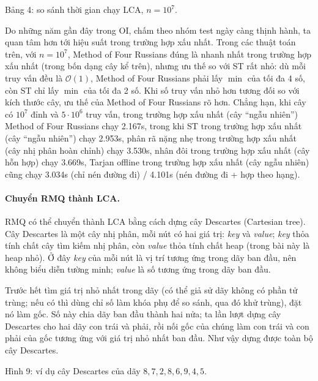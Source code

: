 \documentclass[11pt]{article}
\newcommand{\Oh}{\mathcal{O}}
\begin{document}
\begin{center}
\small Bảng 4: so sánh thời gian chạy LCA, \(n=10^7\).
\end{center}

Do những năm gần đây trong OI, chấm theo nhóm test ngày càng thịnh hành, ta
quan tâm hơn tới hiệu suất trong trường hợp xấu nhất. Trong các thuật toán
trên, với \(n=10^7\), Method of Four Russians đúng là nhanh nhất trong trường
hợp xấu nhất (trong bốn dạng cây kể trên), nhưng ưu thế so với ST rất nhỏ: dù
mỗi truy vấn đều là \(\Oh(1)\), Method of Four Russians phải lấy \(\min\) của
tối đa 4 số, còn ST chỉ lấy \(\min\) của tối đa 2 số. Khi số truy vấn nhỏ hơn
tương đối so với kích thước cây, ưu thế của Method of Four Russians rõ hơn.
Chẳng hạn, khi cây có \(10^7\) đỉnh và \(5\cdot 10^6\) truy vấn, trong trường
hợp xấu nhất (cây ``ngẫu nhiên'') Method of Four Russians chạy 2.167s, trong
khi ST trong trường hợp xấu nhất (cây ``ngẫu nhiên'') chạy 2.953s, phân rã
nặng nhẹ trong trường hợp xấu nhất (cây nhị phân hoàn chỉnh) chạy 3.530s, nhân
đôi trong trường hợp xấu nhất (cây hỗn hợp) chạy 3.669s, Tarjan offline trong
trường hợp xấu nhất (cây ngẫu nhiên) cũng chạy 3.034s (chỉ nén đường đi) /
4.101s (nén đường đi + hợp theo hạng).

\paragraph{Chuyển RMQ thành LCA.}
RMQ có thể chuyển thành LCA bằng cách dựng cây Descartes (Cartesian tree). Cây
Descartes là một cây nhị phân, mỗi nút có hai giá trị: \emph{key} và
\emph{value}; \emph{key} thỏa tính chất cây tìm kiếm nhị phân, còn
\emph{value} thỏa tính chất heap (trong bài này là heap nhỏ). Ở đây
\emph{key} của mỗi nút là vị trí tương ứng trong dãy ban đầu, nên không biểu
diễn tường minh; \emph{value} là số tương ứng trong dãy ban đầu.

Trước hết tìm giá trị nhỏ nhất trong dãy (có thể giả sử dãy không có phần tử
trùng; nếu có thì dùng chỉ số làm khóa phụ để so sánh, qua đó khử trùng), đặt
nó làm gốc. Số này chia dãy ban đầu thành hai nửa; ta lần lượt dựng cây
Descartes cho hai dãy con trái và phải, rồi nối gốc của chúng làm con trái và
con phải của gốc tương ứng với giá trị nhỏ nhất ban đầu. Như vậy dựng được
toàn bộ cây Descartes.

\begin{center}

\small Hình 9: ví dụ cây Descartes của dãy \(8,7,2,8,6,9,4,5\).
\end{center}
\end{document}
